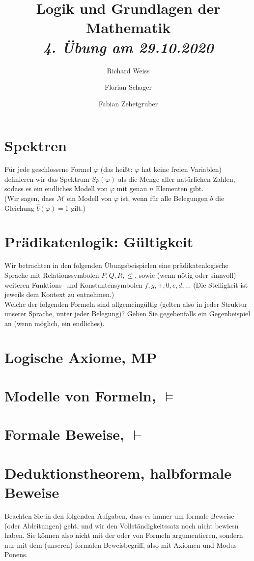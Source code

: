 \documentclass{article}
\title
{
  Logik und Grundlagen der Mathematik \\
  \vspace{4pt}
  \normalsize
  \textit{4. Übung am 29.10.2020}
}
\author
{
  Richard Weiss
  \and
  Florian Schager
  \and
  Fabian Zehetgruber
}
\date{}
\begin{document}
\maketitle

\section*{Spektren}

Für jede geschlossene Formel $\varphi$ (das heißt: $\varphi$ hat keine freien Variablen)
definieren wir das Spektrum $Sp(\varphi)$ als die Menge aller natürlichen Zahlen,
sodass es ein endliches Modell von $\varphi$ mit genau $n$ Elementen gibt. \\
(Wir sagen, dass $\mathcal{M}$ ein Modell von $\varphi$ ist, wenn für alle Belegungen
$b$ die Gleichung $\hat{b}(\varphi) = 1$ gilt.)



\section*{Prädikatenlogik: Gültigkeit}

Wir betrachten in den folgenden Übungsbeispielen eine prädikatenlogische Sprache
mit Relationssymbolen $P, Q, R, \leq$, sowie (wenn nötig oder sinnvoll) weiteren
Funktions- und Konstantensymbolen $f, g, +, 0, c, d, \dots$
(Die Stelligkeit ist jeweils dem Kontext zu entnehmen.) \\
Welche der folgenden Formeln sind allgemeingültig (gelten also in jeder Struktur
unserer Sprache, unter jeder Belegung)?
Geben Sie gegebenfalls ein Gegenbeispiel an (wenn möglich, ein endliches).



\section*{Logische Axiome, MP}



\section*{Modelle von Formeln, $\vDash$}



\section*{Formale Beweise, $\vdash$}




\section*{Deduktionstheorem, halbformale Beweise}

Beachten Sie in den folgenden Aufgaben, dass es immer um formale Beweise (oder Ableitungen)
geht, und wir den Vollständigkeitssatz noch nicht bewiesn haben. Sie können also
nicht mit der  oder  von Formeln argumentieren,
sondern nur mit dem (unseren) formalen Beweisbegriff, also mit Axiomen und Modus Ponens.


\end{document}
